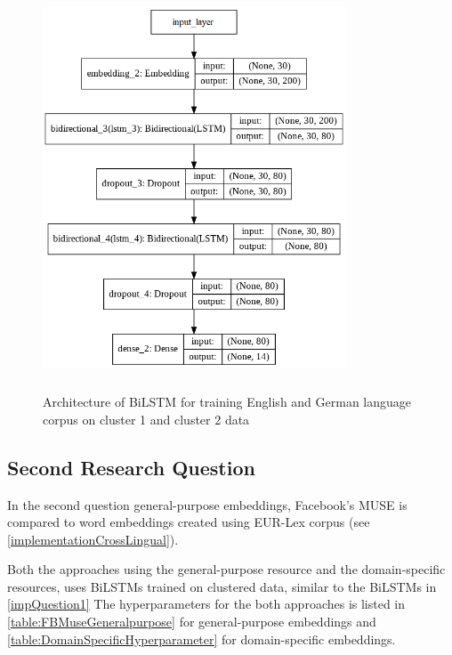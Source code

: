 \begin{figure}[!ht]
    \centering
    \includegraphics[width=9cm, height=12cm]{pics/LSTM_LEGALEMB_CLUSTER_1.png}
    \captionsetup{justification=centering,margin=2cm}
    \caption{Architecture of \gls{BiLSTM} for training English and German language corpus on cluster 1 and cluster 2 data}
    \label{fig:cluster1&2LSTM}
\end{figure}


\clearpage

\subsection{Second Research Question}
In the second question general-purpose embeddings, Facebook's MUSE is compared to word embeddings created using EUR-Lex corpus (see \ref{implementationCrossLingual}).

Both the approaches using the general-purpose resource and the domain-specific resources, uses \glspl{BiLSTM} trained on clustered data, similar to the \glspl{BiLSTM} in \ref{impQuestion1}
The hyperparameters for the both approaches is listed in \ref{table:FBMuseGeneralpurpose} for general-purpose embeddings and \ref{table:DomainSpecificHyperparameter} for domain-specific embeddings.

